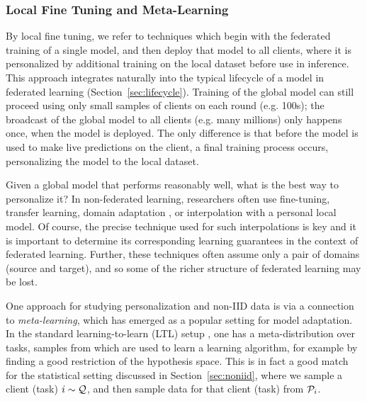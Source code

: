 \documentclass[11pt]{article}
\begin{document}


\subsubsection{Local Fine Tuning and Meta-Learning}

By local fine tuning, we refer to techniques which begin with the federated training of a single model, and then deploy that model to all clients, where it is personalized by additional training on the local dataset before use in inference. This approach integrates naturally into the typical lifecycle of a model in federated learning (Section~\ref{sec:lifecycle}). Training of the global model can still proceed using only small samples of clients on each round (e.g. 100s); the broadcast of the global model to all clients (e.g. many millions) only happens once, when the model is deployed. The only difference is that before the model is used to make live predictions on the client, a final training process occurs, personalizing the model to the local dataset.

Given a global model that performs reasonably well, what is the best way to personalize it?  In non-federated learning, researchers often use fine-tuning, transfer learning, domain adaptation \cite{mansour2009domain,cortes2014domain,ben2010theory, mansour2020theory, cortes2020multiple}, or interpolation with a personal local model. Of course, the precise technique used for such interpolations is key and it is important to determine its corresponding learning guarantees in the context of federated learning. Further, these techniques often assume only a pair of domains (source and target), and so some of the richer structure of federated learning may be lost.

One approach for studying personalization and non-IID data is via a connection to {\em meta-learning}, which has emerged as a popular setting for model adaptation.
%
In the standard learning-to-learn (LTL) setup \citep{baxter00model}, one has a meta-distribution over tasks, samples from which are used to learn a learning algorithm, for example by finding a good restriction of the hypothesis space. This is in fact a good match for the statistical setting discussed in Section~\ref{sec:noniid}, where we sample a client (task) $i \sim \mathcal{Q}$, and then sample data for that client (task) from $\mathcal{P}_i$.
\end{document}
